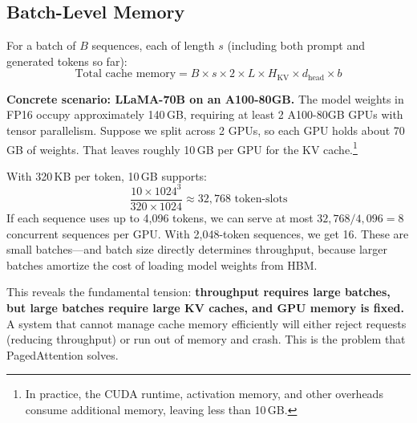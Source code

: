 \subsection{Batch-Level Memory}

%
For a batch of $B$ sequences, each of length $s$ (including both prompt and generated tokens so far):
\begin{equation}
\label{eq:batch-cache}
\text{Total cache memory} = B \times s \times 2 \times L \times H_{\text{KV}} \times d_{\text{head}} \times b
\end{equation}

\begin{notebox}
\textbf{Concrete scenario: LLaMA-70B on an A100-80GB.} The model weights in FP16 occupy approximately 140\,GB, requiring at least 2 A100-80GB GPUs with tensor parallelism. Suppose we split across 2 GPUs, so each GPU holds about 70\,GB of weights. That leaves roughly 10\,GB per GPU for the KV cache.\footnote{In practice, the CUDA runtime, activation memory, and other overheads consume additional memory, leaving less than 10\,GB.}

With 320\,KB per token, 10\,GB supports:
\[
\frac{10 \times 1024^3}{320 \times 1024} \approx 32{,}768 \text{ token-slots}
\]
If each sequence uses up to 4,096 tokens, we can serve at most $32{,}768 / 4{,}096 = 8$ concurrent sequences per GPU. With 2,048-token sequences, we get 16. These are small batches---and batch size directly determines throughput, because larger batches amortize the cost of loading model weights from HBM.
\end{notebox}

This reveals the fundamental tension: \textbf{throughput requires large batches, but large batches require large KV caches, and GPU memory is fixed.} A system that cannot manage cache memory efficiently will either reject requests (reducing throughput) or run out of memory and crash. This is the problem that PagedAttention solves.

